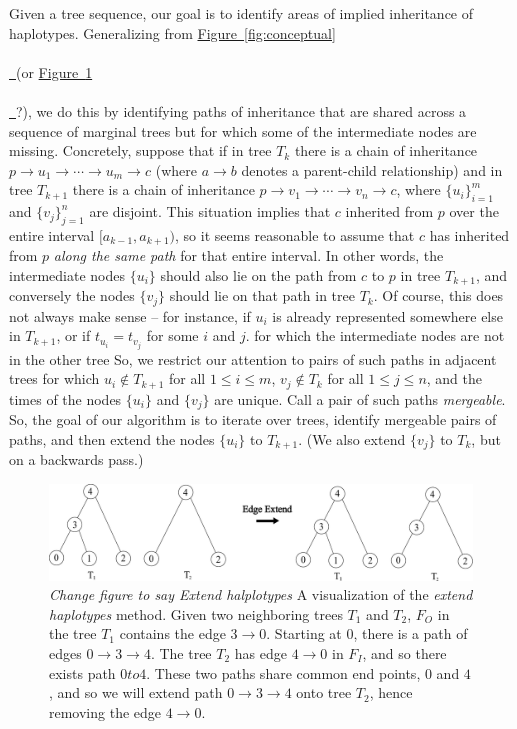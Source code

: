 \documentclass[10pt,twoside,lineno]{gsajnl}
\newcommand{\comment}[1]{{\color{violet} \it #1}}
\newcommand*{\figref}[2][]{%
	\hyperref[{#2}]{%
		Figure~\ref*{#2}%
		\ifx\\#1\\%
		\else
		\,#1%
		\fi
	}%
}
\begin{document}
Given a tree sequence, our goal is to
identify areas of implied inheritance of haplotypes.
Generalizing from \figref{fig:conceptual} (or \figref{fig:extending_diagram}?),
we do this by identifying paths of inheritance that are shared across a sequence of marginal trees
but for which some of the intermediate nodes are missing.
Concretely, suppose that 
if in tree $T_k$ there is a chain of inheritance
$p \to u_1 \to \cdots \to u_m \to c$
(where $a \to b$ denotes a parent-child relationship)
and in tree $T_{k+1}$ there is a chain of inheritance
$p \to v_1 \to \cdots \to v_n \to c$,
where $\{u_i\}_{i=1}^m$ and $\{v_j\}_{j=1}^n$ are disjoint.
This situation implies that $c$ inherited from $p$ over the entire interval $[a_{k-1}, a_{k+1})$,
so it seems reasonable to assume that $c$ has inherited from $p$ \emph{along the same path} for that entire interval.
In other words, the intermediate nodes $\{u_i\}$ should also lie on the path from $c$ to $p$ in tree $T_{k+1}$,
and conversely the nodes $\{v_j\}$ should lie on that path in tree $T_k$.
Of course, this does not always make sense --
for instance, if $u_i$ is already represented somewhere else in $T_{k+1}$,
or if $t_{u_i} = t_{v_j}$ for some $i$ and $j$.
for which the intermediate nodes are not in the other tree
So, we restrict our attention to pairs of such paths in adjacent trees
for which
$u_i \notin T_{k+1}$ for all $1 \le i \le m$,
$v_j \notin T_k$ for all $1 \le j \le n$,
and the times of the nodes $\{u_i\}$ and $\{v_j\}$ are unique.
Call a pair of such paths \emph{mergeable}.
So, the goal of our algorithm is to iterate over trees,
identify mergeable pairs of paths,
and then extend the nodes $\{u_i\}$ to $T_{k+1}$.
(We also extend $\{v_j\}$ to $T_k$, but on a backwards pass.)

\begin{figure}[!ht]
\begin{center}
	\includegraphics[width=5in]{edge_extend_method.pdf}
\end{center}
\caption{\comment{Change figure to say Extend halplotypes} A visualization of the \textit{extend haplotypes} method. Given two neighboring trees $T_1$ and $T_2$, $F_O$ in the tree $T_1$ contains the edge $3\to 0$. Starting at $0$, there is a path of edges $0 \to 3 \to 4$. The tree $T_2$ has edge $4 \to 0$ in $F_I$, and so there exists path $0 to 4$. These two paths share common end points, $0$ and $4$, and so we will extend path $0 \to 3 \to 4$ onto tree $T_2$, hence removing the edge $4\to 0$.
    \label{fig:extending_diagram}
}
\end{figure}
\end{document}
